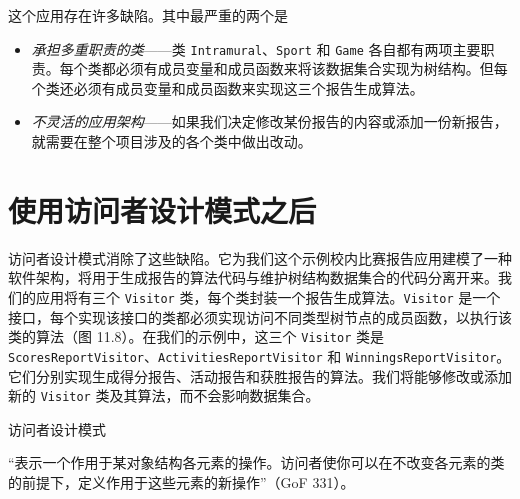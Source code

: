 
这个应用存在许多缺陷。其中最严重的两个是

\begin{itemize}
\item \emph{承担多重职责的类}——类 \texttt{Intramural}、\texttt{Sport} 和 \texttt{Game} 各自都有两项主要职责。每个类都必须有成员变量和成员函数来将该数据集合实现为树结构。但每个类还必须有成员变量和成员函数来实现这三个报告生成算法。
\item \emph{不灵活的应用架构}——如果我们决定修改某份报告的内容或添加一份新报告，就需要在整个项目涉及的各个类中做出改动。
\end{itemize}

\section{使用访问者设计模式之后}

访问者设计模式消除了这些缺陷。它为我们这个示例校内比赛报告应用建模了一种软件架构，将用于生成报告的算法代码与维护树结构数据集合的代码分离开来。我们的应用将有三个 \texttt{Visitor} 类，每个类封装一个报告生成算法。\texttt{Visitor} 是一个接口，每个实现该接口的类都必须实现访问不同类型树节点的成员函数，以执行该类的算法（图 11.8）。在我们的示例中，这三个 \texttt{Visitor} 类是 \texttt{Scores\allowbreak{}Report\allowbreak{}Visitor}、\texttt{Activities\allowbreak{}Report\allowbreak{}Visitor} 和 \texttt{Winnings\allowbreak{}Report\allowbreak{}Visitor}。它们分别实现生成得分报告、活动报告和获胜报告的算法。我们将能够修改或添加新的 \texttt{Visitor} 类及其算法，而不会影响数据集合。

\begin{mySidebar}{访问者设计模式}

“表示一个作用于某对象结构各元素的操作。访问者使你可以在不改变各元素的类的前提下，定义作用于这些元素的新操作”（GoF 331）。
\end{mySidebar}


